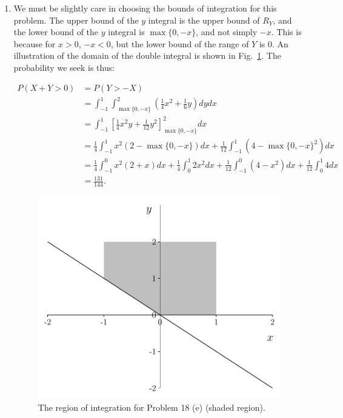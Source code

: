 \begin{problem}{18}
\begin{enumerate}
\item
We must be slightly care in choosing the bounds of integration for this problem.  The upper bound of the $y$ integral is the upper bound of $R_Y$, and the lower bound of the $y$ integral is $\max \{0, -x\}$, and not simply $-x$.  This is because for $x>0$, $-x<0$, but the lower bound of the range of $Y$ is 0.  An illustration of the domain of the double integral is shown in Fig.~\ref{fig:prob_18}.  The probability we seek is thus:

\begin{align*}
P(X+Y>0) &= P(Y>-X)\\
& = \int_{-1}^1 \int_{\max \{0, -x\} }^2\left( \frac{1}{4}x^2+\frac{1}{6}y \right)dydx \\
&= \int_{-1}^1 \left [\frac{1}{4}x^2 y +\frac{1}{12}y^2 \right]_{\max \{ 0, -x \} }^2 dx \\
&= \frac{1}{4}\int_{-1}^1 x^2 \left(2-\max \{0, -x\} \right) dx+ \frac{1}{12}\int_{-1}^1 \left(4-\max \{0, -x\}^2 \right) dx \\
&= \frac{1}{4}\int_{-1}^0 x^2 \left(2+x \right) dx+ \frac{1}{4}\int_{0}^1 2 x^2 dx+ \frac{1}{12}\int_{-1}^0 \left(4-x^2 \right) dx+\frac{1}{12}\int_{0}^1 4 dx \\
& = \frac{131}{144}.
\end{align*}

	\begin{figure}[t]
	\centering
      		 \includegraphics[totalheight=6cm]{chpt5/prob18.pdf}
  			  \caption{The region of integration for Problem 18 (e) (shaded region).}
    			   \label{fig:prob_18}
	\end{figure}

\end{enumerate}
\end{problem}


